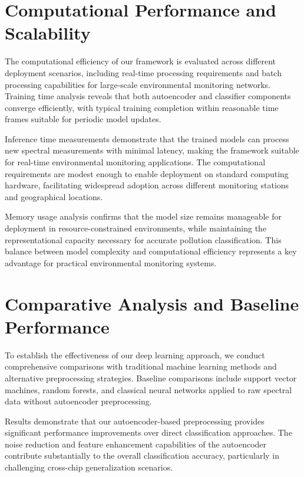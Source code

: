 \section{Computational Performance and Scalability}
\label{sec:computational_performance}

The computational efficiency of our framework is evaluated across different deployment scenarios, including real-time processing requirements and batch processing capabilities for large-scale environmental monitoring networks. Training time analysis reveals that both autoencoder and classifier components converge efficiently, with typical training completion within reasonable time frames suitable for periodic model updates.

Inference time measurements demonstrate that the trained models can process new spectral measurements with minimal latency, making the framework suitable for real-time environmental monitoring applications. The computational requirements are modest enough to enable deployment on standard computing hardware, facilitating widespread adoption across different monitoring stations and geographical locations.

Memory usage analysis confirms that the model size remains manageable for deployment in resource-constrained environments, while maintaining the representational capacity necessary for accurate pollution classification. This balance between model complexity and computational efficiency represents a key advantage for practical environmental monitoring systems.

\section{Comparative Analysis and Baseline Performance}
\label{sec:comparative_analysis}

To establish the effectiveness of our deep learning approach, we conduct comprehensive comparisons with traditional machine learning methods and alternative preprocessing strategies. Baseline comparisons include support vector machines, random forests, and classical neural networks applied to raw spectral data without autoencoder preprocessing.

Results demonstrate that our autoencoder-based preprocessing provides significant performance improvements over direct classification approaches. The noise reduction and feature enhancement capabilities of the autoencoder contribute substantially to the overall classification accuracy, particularly in challenging cross-chip generalization scenarios.

